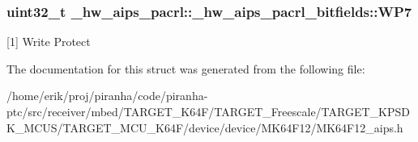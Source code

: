 \subsubsection[{\texorpdfstring{W\+P7}{WP7}}]{\setlength{\rightskip}{0pt plus 5cm}uint32\+\_\+t \+\_\+hw\+\_\+aips\+\_\+pacrl\+::\+\_\+hw\+\_\+aips\+\_\+pacrl\+\_\+bitfields\+::\+W\+P7}\hypertarget{struct__hw__aips__pacrl_1_1__hw__aips__pacrl__bitfields_af476842cedc5f2fbe40c02b044f4c68b}{}\label{struct__hw__aips__pacrl_1_1__hw__aips__pacrl__bitfields_af476842cedc5f2fbe40c02b044f4c68b}
\mbox{[}1\mbox{]} Write Protect 

The documentation for this struct was generated from the following file\+:\begin{DoxyCompactItemize}
\item 
/home/erik/proj/piranha/code/piranha-\/ptc/src/receiver/mbed/\+T\+A\+R\+G\+E\+T\+\_\+\+K64\+F/\+T\+A\+R\+G\+E\+T\+\_\+\+Freescale/\+T\+A\+R\+G\+E\+T\+\_\+\+K\+P\+S\+D\+K\+\_\+\+M\+C\+U\+S/\+T\+A\+R\+G\+E\+T\+\_\+\+M\+C\+U\+\_\+\+K64\+F/device/device/\+M\+K64\+F12/M\+K64\+F12\+\_\+aips.\+h\end{DoxyCompactItemize}
